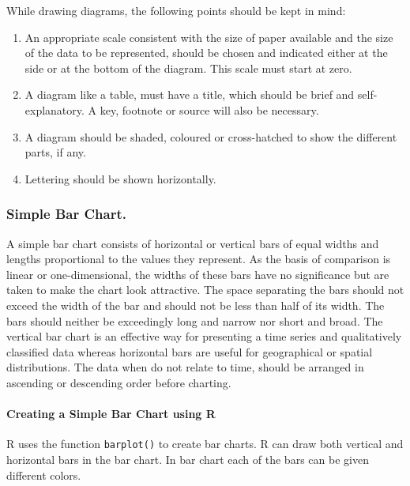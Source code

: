 \documentclass[]{article}
\let\oldparagraph\paragraph
\renewcommand{\paragraph}[1]{\oldparagraph{#1}\mbox{}}
\begin{document}
While drawing diagrams, the following points should be kept in mind:

\begin{enumerate}
\def\labelenumi{(\roman{enumi})}
\item
  An appropriate scale consistent with the size of paper available and
  the size of the data to be represented, should be chosen and indicated
  either at the side or at the bottom of the diagram. This scale must
  start at zero.
\item
  A diagram like a table, must have a title, which should be brief and
  self-explanatory. A key, footnote or source will also be necessary.
\item
  A diagram should be shaded, coloured or cross-hatched to show the
  different parts, if any.
\item
  Lettering should be shown horizontally.
\end{enumerate}

\hypertarget{simple-bar-chart.}{%
\subsubsection{Simple Bar Chart.}\label{simple-bar-chart.}}

A simple bar chart consists of horizontal or vertical bars of equal
widths and lengths proportional to the values they represent. As the
basis of comparison is linear or one-dimensional, the widths of these
bars have no significance but are taken to make the chart look
attractive. The space separating the bars should not exceed the width of
the bar and should not be less than half of its width. The bars should
neither be exceedingly long and narrow nor short and broad. The vertical
bar chart is an effective way for presenting a time series and
qualitatively classified data whereas horizontal bars are useful for
geographical or spatial distributions. The data when do not relate to
time, should be arranged in ascending or descending order before
charting.

\hypertarget{creating-a-simple-bar-chart-using-r}{%
\paragraph{Creating a Simple Bar Chart using
R}\label{creating-a-simple-bar-chart-using-r}}

R uses the function \texttt{barplot()} to create bar charts. R can draw
both vertical and horizontal bars in the bar chart. In bar chart each of
the bars can be given different colors.
\end{document}
